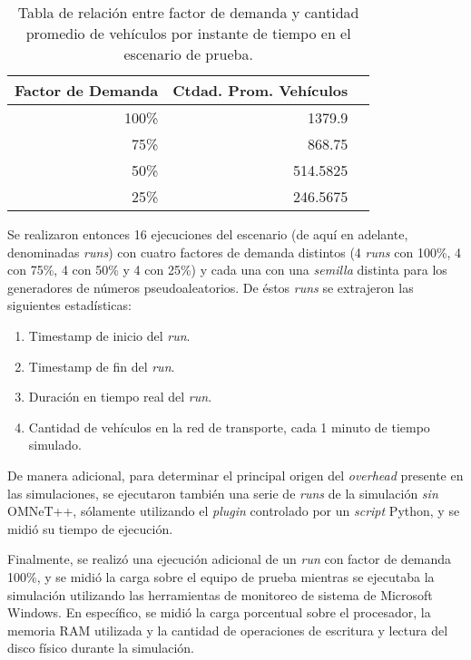 \begin{table}[tpb]
    \centering
    \begin{tabular}{@{}rrr@{}}
        \textbf{Factor de Demanda} & \textbf{Ctdad. Prom. Vehículos} \\ \midrule
        100\%           & 1379.9 \\ %
        75\%            & 868.75 \\ %
        50\%            & 514.5825 \\ %
        25\%            & 246.5675 \\ \bottomrule
    \end{tabular}
    \caption[Factor de demanda vs. cantidad promedio de vehículos]{Tabla de relación entre factor de demanda y cantidad promedio de vehículos por instante de tiempo en el escenario de prueba.}
    \label{table:demandfactor}
\end{table}

Se realizaron entonces 16 ejecuciones del escenario (de aquí en adelante, denominadas \emph{runs}) con cuatro factores de demanda distintos (4 \emph{runs} con 100\%, 4 con 75\%, 4 con 50\% y 4 con 25\%) y cada una con una \emph{semilla} distinta para los generadores de números pseudoaleatorios. De éstos \emph{runs} se extrajeron las siguientes estadísticas:

\begin{enumerate}
    \item Timestamp de inicio del \emph{run}.
    \item Timestamp de fin del \emph{run}.
    \item Duración en tiempo real del \emph{run}.
    \item Cantidad de vehículos en la red de transporte, cada 1 minuto de tiempo simulado.
\end{enumerate}

De manera adicional, para determinar el principal origen del \emph{overhead} presente en las simulaciones, se ejecutaron también una serie de \emph{runs} de la simulación \emph{sin} OMNeT++, sólamente utilizando el \emph{plugin} controlado por un \emph{script} Python, y se midió su tiempo de ejecución.

Finalmente, se realizó una ejecución adicional de un \emph{run} con factor de demanda 100\%, y se midió la carga sobre el equipo de prueba mientras se ejecutaba la simulación utilizando las herramientas de monitoreo de sistema de Microsoft Windows. En específico, se midió la carga porcentual sobre el procesador, la memoria RAM utilizada y la cantidad de operaciones de escritura y lectura del disco físico durante la simulación.

